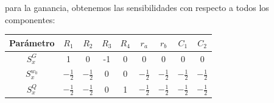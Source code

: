 \documentclass[../tc_tpfinal_main.tex]{subfiles}
\begin{document}
para la ganancia, obtenemos las sensibilidades con respecto a todos los componentes:\par

 	\begin{table}[H] %
				\centering
 				\begin{tabular}{||c c c c c c c c c||} 
 					\hline
				  Parámetro& $R_1$ & $R_2$ & $R_3$ & $R_4$ & $r_a$ & $r_b$&$C_1$&$C_2$\\ [0.5ex] 
 					\hline\hline
					 $S^G_x$& 1 & 0& -1& 0&0&0&0&0\\
					 $S^{w_0}_x$& $- \frac{1}{2}$ &$- \frac{1}{2}$& 0& 0&$- \frac{1}{2}$&$- \frac{1}{2}$&$- \frac{1}{2}$&$- \frac{1}{2}$\\
					 $S^{Q}_x$&$- \frac{1}{2}$ &$- \frac{1}{2}$& 0& 1&$- \frac{1}{2}$&$- \frac{1}{2}$&$- \frac{1}{2}$&$- \frac{1}{2}$\\[1ex] 
					\hline
				\end{tabular}
			\end{table}
		
\end{document}
